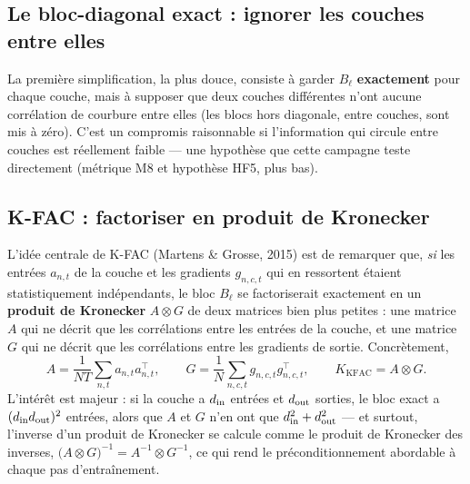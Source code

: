 \documentclass[11pt,a4paper]{article}
\begin{document}
\subsection{Le bloc-diagonal exact : ignorer les couches entre elles}

La première simplification, la plus douce, consiste à garder $B_\ell$ \textbf{exactement} pour
chaque couche, mais à supposer que deux couches différentes n'ont aucune corrélation de courbure
entre elles (les blocs hors diagonale, entre couches, sont mis à zéro). C'est un compromis
raisonnable si l'information qui circule entre couches est réellement faible — une hypothèse que
cette campagne teste directement (métrique M8 et hypothèse HF5, plus bas).

\subsection{K-FAC : factoriser en produit de Kronecker}

L'idée centrale de K-FAC (Martens \& Grosse, 2015) est de remarquer que, \emph{si} les entrées
$a_{n,t}$ de la couche et les gradients $g_{n,c,t}$ qui en ressortent étaient statistiquement
indépendants, le bloc $B_\ell$ se factoriserait exactement en un \textbf{produit de Kronecker}
$A\otimes G$ de deux matrices bien plus petites : une matrice $A$ qui ne décrit que les corrélations
entre les entrées de la couche, et une matrice $G$ qui ne décrit que les corrélations entre les
gradients de sortie. Concrètement,
\[
A = \frac1{NT}\sum_{n,t} a_{n,t}a_{n,t}^\top, \qquad G = \frac1N\sum_{n,c,t} g_{n,c,t}g_{n,c,t}^\top,
\qquad K_{\mathrm{KFAC}} = A\otimes G.
\]
L'intérêt est majeur : si la couche a $d_{\rm in}$ entrées et $d_{\rm out}$ sorties, le bloc exact a
$(d_{\rm in}d_{\rm out})^2$ entrées, alors que $A$ et $G$ n'en ont que $d_{\rm in}^2+d_{\rm out}^2$ —
et surtout, l'inverse d'un produit de Kronecker se calcule comme le produit de Kronecker des
inverses, $\big(A\otimes G\big)^{-1}=A^{-1}\otimes G^{-1}$, ce qui rend le préconditionnement
abordable à chaque pas d'entraînement.
\end{document}
